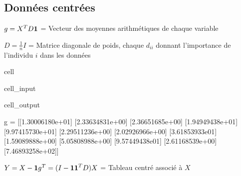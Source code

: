 \documentclass[letterpaper,10pt,english]{jupyterBook}
\begin{document}
\subsection{Données centrées}
\label{\detokenize{acp:id1}}
\sphinxAtStartPar
\(g=X^TD{\bf 1}\) = Vecteur des moyennes arithmétiques de chaque variable

\sphinxAtStartPar
\(D=\frac{1}{n}I\) = Matrice diagonale de poids, chaque \(d_{ii}\) donnant l’importance de l’individu \(i\) dans les données

\begin{sphinxuseclass}{cell}\begin{sphinxVerbatimInput}

\begin{sphinxuseclass}{cell_input}
\begin{sphinxVerbatim}[commandchars=\\\{\}]
  
    
  \PYG{p}{[}  \PYG{p}{[}\PYG{p}{]}\PYG{p}{]}
      
 
\end{sphinxVerbatim}

\end{sphinxuseclass}\end{sphinxVerbatimInput}
\begin{sphinxVerbatimOutput}

\begin{sphinxuseclass}{cell_output}
\begin{sphinxVerbatim}[commandchars=\\\{\}]
g = 
 [[1.30006180e+01]
 [2.33634831e+00]
 [2.36651685e+00]
 [1.94949438e+01]
 [9.97415730e+01]
 [2.29511236e+00]
 [2.02926966e+00]
 [3.61853933e\PYGZhy{}01]
 [1.59089888e+00]
 [5.05808988e+00]
 [9.57449438e\PYGZhy{}01]
 [2.61168539e+00]
 [7.46893258e+02]]
\end{sphinxVerbatim}

\end{sphinxuseclass}\end{sphinxVerbatimOutput}

\end{sphinxuseclass}
\sphinxAtStartPar
\(Y = X - {\bf 1} g^T = (I - {\bf 11}^TD)X\) = Tableau centré associé à \(X\)
\end{document}
